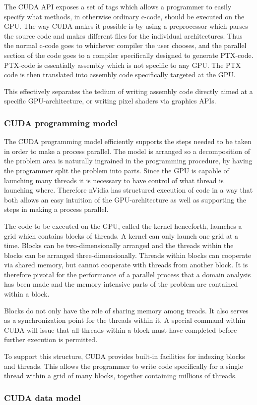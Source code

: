 The CUDA API exposes a set of tags which allows a programmer to easily specify what methods, in otherwise ordinary c-code, should be executed on the GPU. The way CUDA makes it possible is by using a preprocessor which parses the source code and makes different files for the individual architectures. Thus the normal c-code goes to whichever compiler the user chooses, and the parallel section of the code goes to a compiler specifically designed to generate PTX-code. PTX-code is essentially assembly which is not specific to any GPU. The PTX code is then translated into assembly code specifically targeted at the GPU.

This effectively separates the tedium of writing assembly code directly aimed at a specific GPU-architecture, or writing pixel shaders via graphics APIs.

\subsubsection{CUDA programming model}
The CUDA programming model efficiently supports the steps needed to be taken in order to make a process parallel. The model is arranged so a decomposition of the problem area is naturally ingrained in the programming procedure, by having the programmer split the problem into parts. Since the GPU is capable of launching many threads it is necessary to have control of what thread is launching where. Therefore nVidia has structured execution of code in a way that both allows an easy intuition of the GPU-architecture as well as supporting the steps in making a process parallel.

The code to be executed on the GPU, called the kernel henceforth, launches a grid which contains blocks of threads. A kernel can only launch one grid at a time. Blocks can be two-dimensionally arranged and the threads within the blocks can be arranged three-dimensionally. Threads within blocks can cooperate via shared memory, but cannot cooperate with threads from another block. It is therefore pivotal for the performance of a parallel process that a domain analysis has been made and the memory intensive parts of the problem are contained within a block.

Blocks do not only have the role of sharing memory among treads. It also serves as a synchronization point for the threads within it. A special command within CUDA will issue that all threads within a block must have completed before further execution is permitted.

To support this structure, CUDA provides built-in facilities for indexing blocks and threads. This allows the programmer to write code specifically for a single thread within a grid of many blocks, together containing millions of threads.


\subsubsection{CUDA data model}

